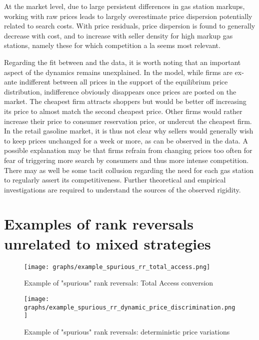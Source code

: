 \documentclass[english]{article}
\begin{document}
At the market level, due to large persistent differences in gas station markups, working with raw prices leads to largely overestimate price dispersion potentially related to search costs. With price residuals, price dispersion is found to generally decrease with cost, and to increase with seller density for high markup gas stations, namely these for which competition a la \cite{VAR80} seems most relevant.

Regarding the fit between \cite{VAR80} and the data, it is worth noting that an important aspect of the dynamics remains unexplained. In the model, while firms are ex-ante indifferent between all prices in the support of the equilibrium price distribution, indifference obviously disappears once prices are posted on the market. The cheapest firm attracts shoppers but would be better off increasing its price to almost match the second cheapest price. Other firms would rather increase their price to consumer reservation price, or undercut the cheapest firm. In the retail gasoline market, it is thus not clear why sellers would generally wish to keep prices unchanged for a week or more, as can be observed in the data. A possible explanation may be that firms refrain from changing prices too often for fear of triggering more search by consumers and thus more intense competition. There may as well be some tacit collusion regarding the need for each gas station to regularly assert its competitiveness. Further theoretical and empirical investigations are required to understand the sources of the observed rigidity.

\newpage



\appendix

\section{Examples of rank reversals unrelated to mixed strategies}

\begin{figure}[htb!]
    \caption{Example of "spurious" rank reversals: Total Access conversion}
	\centering
		\texttt{[image: graphs/example\_spurious\_rr\_total\_access.png]}
\label{fig:rr_total_access}
\end{figure}

\begin{figure}[htb!]
    \caption{Example of "spurious" rank reversals: deterministic price variations}
	\centering
\texttt{[image: graphs/example\_spurious\_rr\_dynamic\_price\_discrimination.png]}
\label{fig:rr_dynamic_price_discrimination}
\end{figure}
\end{document}
